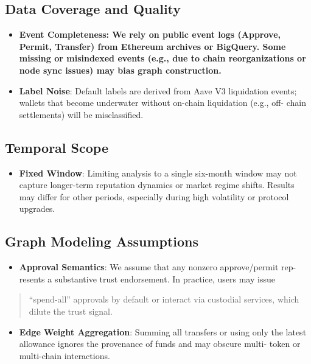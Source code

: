\documentclass[
]{article}
\begin{document}
\subsection{Data Coverage and Quality}\label{data-coverage-and-quality}

\begin{itemize}
\item
  \textbf{Event Completeness: We rely on public event logs (Approve, Permit, Transfer) from Ethereum archives or BigQuery. Some missing or misindexed events (e.g., due to chain reorganizations or node sync issues) may bias graph construction.}
\item
  \textbf{Label Noise}: Default labels are derived from Aave V3 liquidation events; wallets that become underwater without on-chain liquidation (e.g., off- chain settlements) will be misclassified.
\end{itemize}

\subsection{Temporal Scope}\label{temporal-scope}

\begin{itemize}
\item
  \textbf{Fixed Window}: Limiting analysis to a single six-month window may not capture longer-term reputation dynamics or market regime shifts. Results may differ for other periods, especially during high volatility or protocol upgrades.
\end{itemize}

\subsection{Graph Modeling Assumptions}\label{graph-modeling-assumptions}

\begin{itemize}
\item
  \textbf{Approval Semantics}: We assume that any nonzero approve/permit rep- resents a substantive trust endorsement. In practice, users may issue
\end{itemize}

\begin{quote}
``spend-all'' approvals by default or interact via custodial services, which dilute the trust signal.
\end{quote}

\begin{itemize}
\item
  \textbf{Edge Weight Aggregation}: Summing all transfers or using only the latest allowance ignores the provenance of funds and may obscure multi- token or multi-chain interactions.
\end{itemize}
\end{document}
